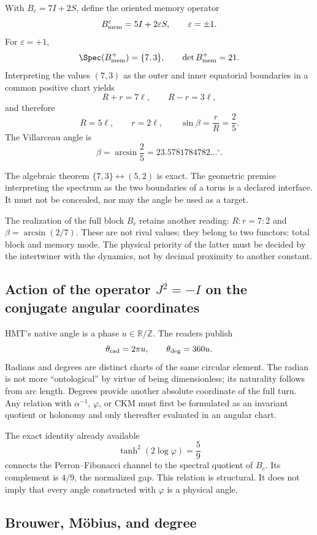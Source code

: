 With \(B_c=7I+2S\), define the oriented memory operator
\[
B_{\rm mem}^{\varepsilon}=5I+2\varepsilon S,
\qquad\varepsilon=\pm1.
\]
For \(\varepsilon=+1\),
\[
\Spec(B_{\rm mem}^{+})=\{7,3\},
\qquad\det B_{\rm mem}^{+}=21.
\]
Interpreting the values \((7,3)\) as the outer and inner equatorial boundaries
in a common positive chart yields
\[
R+r=7\ell,\qquad R-r=3\ell,
\]
and therefore
\[
R=5\ell,\qquad r=2\ell,\qquad
\sin\beta=\frac rR=\frac25.
\]
The Villarceau angle is
\[
\beta=\arcsin\frac25
=23.5781784782\ldots^\circ.
\]

The algebraic theorem \(\{7,3\}\leftrightarrow(5,2)\) is exact. The geometric
premise interpreting the spectrum as the two boundaries of a torus is a
declared interface. It must not be concealed, nor may the angle be used as a target.

The realization of the full block \(B_c\) retains another reading:
\(R:r=7:2\) and \(\beta=\arcsin(2/7)\). These are not rival values; they belong to
two functors: total block and memory mode. The physical priority of the latter
must be decided by the intertwiner with the dynamics, not by decimal proximity to
another constant.

\subsection{Action of the operator \texorpdfstring{\(J^2=-I\)}{J2=-I} on the conjugate angular coordinates}

HMT’s native angle is a phase \(u\in\mathbb R/\mathbb Z\). The readers
publish
\[
\theta_{\rm rad}=2\pi u,
\qquad
\theta_{\rm deg}=360u.
\]
Radians and degrees are distinct charts of the same circular element. The radian is not more “ontological” by virtue of being dimensionless; its naturality follows from arc length. Degrees provide another absolute coordinate of the full turn. Any relation with \(\alpha^{-1}\), \(\varphi\), or CKM must first be formulated as an invariant quotient or holonomy and only thereafter evaluated in an angular chart.

The exact identity already available
\[
\tanh^2(2\log\varphi)=\frac59
\]
connects the Perron--Fibonacci channel to the spectral quotient of \(B_c\). Its
complement is \(4/9\), the normalized gap. This relation is structural.
It does not imply that every angle constructed with \(\varphi\) is a physical angle.

\subsection{Brouwer, Möbius, and degree}

